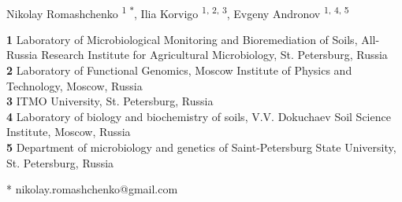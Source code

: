 \documentclass[10pt,letterpaper]{article}
\date{}
\begin{document}
\vspace*{0.2in}

\begin{flushleft}
{\Large
\textbf{} %
}
\newline
\\


Nikolay Romashchenko \textsuperscript{1 $\ast$},
Ilia Korvigo \textsuperscript{1, 2, 3},
Evgeny Andronov \textsuperscript{1, 4, 5}

\bigskip
\textbf{1} Laboratory of Microbiological Monitoring and Bioremediation of Soils, All-Russia Research Institute for Agricultural Microbiology, St. Petersburg, Russia
\\
\textbf{2} Laboratory of Functional Genomics, Moscow Institute of Physics and Technology, Moscow, Russia
\\
\textbf{3} ITMO University, St. Petersburg, Russia
\\
\textbf{4} Laboratory of biology and biochemistry of soils, V.V. Dokuchaev Soil Science Institute, Moscow, Russia
\\
\textbf{5} Department of microbiology and genetics of Saint-Petersburg State University, St. Petersburg, Russia
\\
\bigskip

% 
%





* nikolay.romashchenko@gmail.com

\end{flushleft}
\end{document}
